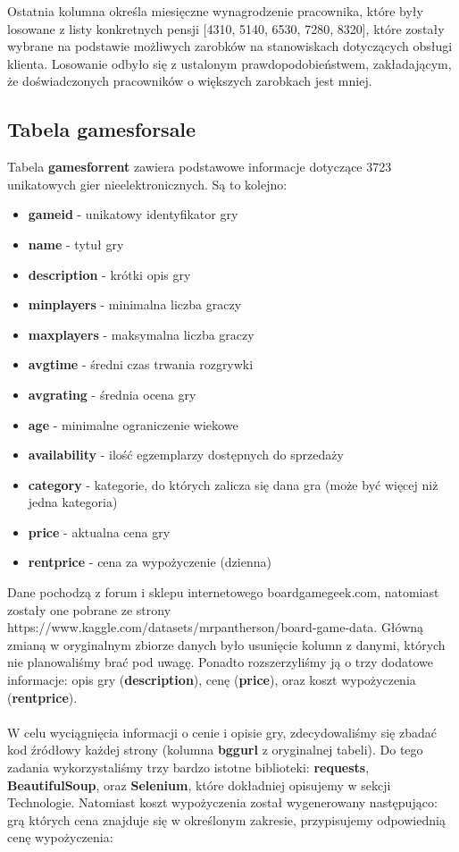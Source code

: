 \documentclass{article}
\begin{document}
		\noindent Ostatnia kolumna określa miesięczne wynagrodzenie pracownika, które były losowane z listy konkretnych pensji [4310, 5140, 6530, 7280, 8320], które zostały wybrane na podstawie możliwych zarobków na stanowiskach dotyczących obsługi klienta. Losowanie odbyło się z ustalonym prawdopodobieństwem, zakładającym, że doświadczonych pracowników o większych zarobkach jest mniej.
		
	\subsection{Tabela games\textunderscore for\textunderscore sale}
	Tabela \textbf{games\textunderscore for\textunderscore rent} zawiera podstawowe informacje dotyczące 3723 unikatowych gier nieelektronicznych. Są to kolejno:
	\begin{itemize}
		\setlength{\itemsep}{-2pt}
		\item \textbf{game\textunderscore id} - unikatowy identyfikator gry
		\item \textbf{name} - tytuł gry
		\item \textbf{description} - krótki opis gry
		\item \textbf{min\textunderscore players} - minimalna liczba graczy
		\item \textbf{max\textunderscore players} - maksymalna liczba graczy
		\item \textbf{avg\textunderscore time} - średni czas trwania rozgrywki
		\item  \textbf{avg\textunderscore rating} - średnia ocena gry
		\item \textbf{age} - minimalne ograniczenie wiekowe
		\item \textbf{availability} - ilość egzemplarzy dostępnych do sprzedaży
		\item  \textbf{category} - kategorie, do których zalicza się dana gra (może być więcej niż jedna kategoria)
		\item \textbf{price} - aktualna cena gry
		\item \textbf{rent\textunderscore price} - cena za wypożyczenie (dzienna)
	\end{itemize}
	
	\noindent Dane pochodzą z forum i sklepu internetowego boardgamegeek.com, natomiast zostały one pobrane ze strony https://www.kaggle.com/datasets/mrpantherson/board-game-data.
	Główną zmianą w oryginalnym zbiorze danych było usunięcie kolumn z danymi, których nie planowaliśmy brać pod uwagę. Ponadto rozszerzyliśmy ją o trzy dodatowe informacje: opis gry (\textbf{description}), cenę (\textbf{price}), oraz koszt wypożyczenia (\textbf{rent\textunderscore price}). \\ \\
	W celu wyciągnięcia informacji o cenie i opisie gry, zdecydowaliśmy się zbadać kod źródłowy każdej strony (kolumna \textbf{bgg\textunderscore url} z oryginalnej tabeli). Do tego zadania wykorzystaliśmy trzy bardzo istotne biblioteki: \textbf{requests}, \textbf{BeautifulSoup}, oraz \textbf{Selenium}, które dokładniej opisujemy w sekcji Technologie. Natomiast koszt wypożyczenia został wygenerowany następująco: grą których cena znajduje się w określonym zakresie, przypisujemy odpowiednią cenę wypożyczenia:
	
\end{document}
